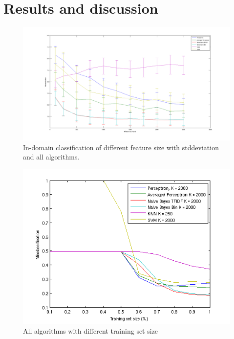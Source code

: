\chapter{Results and discussion}

\begin{figure}[H]
\centering
\includegraphics[scale = 0.2]{fig/featuresize_plot_snowball_unigram.png}
\caption{In-domain classification of different feature size with stddeviation and all algorithms.}
\label{fig:trainingsize}
\end{figure} 

\begin{figure}[H]
\centering
\includegraphics[scale = 0.7]{fig/training-size.png}
\caption{All algorithms with different training set size}
\label{fig:trainingsize}
\end{figure} \\
